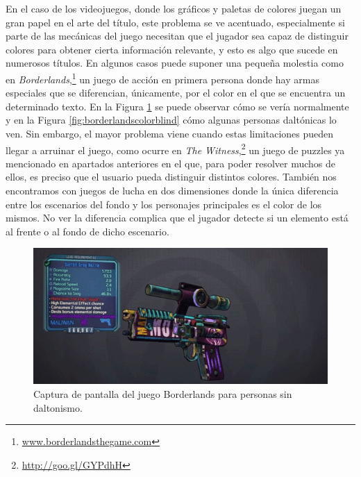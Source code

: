 En el caso de los videojuegos, donde los gráficos y paletas de colores juegan un gran papel en el arte del título, este problema se ve acentuado, especialmente si parte de las mecánicas del juego necesitan que el jugador sea capaz de distinguir colores para obtener cierta información relevante, y esto es algo que sucede en numerosos títulos. En algunos casos puede suponer una pequeña molestia como en \textit{Borderlands},\footnote{\url{www.borderlandsthegame.com}} un juego de acción en primera persona donde hay armas especiales que se diferencian, únicamente, por el color en el que se encuentra un determinado texto. En la Figura \ref{fig:borderlandsnormal} se puede observar cómo se vería normalmente y en la Figura \ref{fig:borderlandscolorblind} cómo algunas personas daltónicas lo ven. 
Sin embargo, el mayor problema viene cuando estas limitaciones pueden llegar a arruinar el juego, como ocurre en \textit{The Witness},\footnote{\url{http://goo.gl/GYPdhH}} un juego de puzzles ya mencionado en apartados anteriores en el que, para poder resolver muchos de ellos, es preciso que el usuario pueda distinguir distintos colores. 
También nos encontramos con juegos de lucha en dos dimensiones donde la única diferencia entre los escenarios del fondo y los personajes principales es el color de los mismos. No ver la diferencia complica que el jugador detecte si un elemento está al frente o al fondo de dicho escenario.

\begin{figure}[H]
		\includegraphics[width=\textwidth,height=\textheight,keepaspectratio]{./img/borderlandsnormal.png}
	\caption{Captura de pantalla del juego Borderlands para personas sin daltonismo.}
	\label{fig:borderlandsnormal}
\end{figure}

